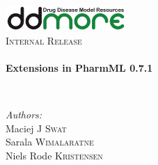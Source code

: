 \begin{titlepage}
\begin{center}

\includegraphics[width=0.35\textwidth]{./logo/ddmore_logo}~\\[1cm]

%
\textsc{\Large Internal Release}\\[0.5cm]

\HRule \\[0.4cm]
{ \huge \bfseries Extensions in PharmML 0.7.1 \\[0.4cm] }

\HRule \\[1.5cm]

\begin{minipage}{0.5\textwidth}
\begin{flushleft} \large
\emph{Authors:}\\
Maciej J \textsc{Swat}\\
Sarala \textsc{Wimalaratne}\\
Niels Rode \textsc{Kristensen}\\
\end{flushleft}
\end{minipage}


\end{center}
\end{titlepage}
